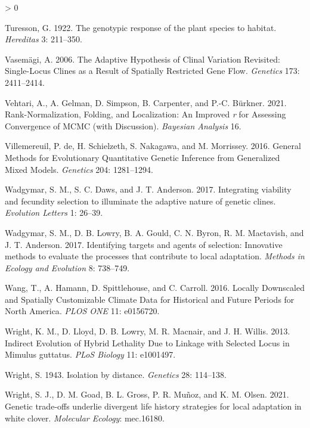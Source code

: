 \documentclass[
  12pt,
]{article}
\newlength{\cslhangindent}
\newenvironment{CSLReferences}[2] %
 {%
  \setlength{\parindent}{0pt}
  \ifodd #1 \everypar{\setlength{\hangindent}{\cslhangindent}}\ignorespaces\fi
  \ifnum #2 > 0
  \setlength{\parskip}{#2\baselineskip}
  \fi
 }%
 {}
\begin{document}
\begin{CSLReferences}{1}{0}
\leavevmode\hypertarget{ref-turesson_genotypic_1922}{}%
Turesson, G. 1922. The genotypic response of the plant species to habitat. \emph{Hereditas} 3: 211--350.

\leavevmode\hypertarget{ref-vasemagi_adaptive_2006}{}%
Vasemägi, A. 2006. The {Adaptive} {Hypothesis} of {Clinal} {Variation} {Revisited}: {Single}-{Locus} {Clines} as a {Result} of {Spatially} {Restricted} {Gene} {Flow}. \emph{Genetics} 173: 2411--2414.

\leavevmode\hypertarget{ref-vehtari_rank-normalization_2021}{}%
Vehtari, A., A. Gelman, D. Simpson, B. Carpenter, and P.-C. Bürkner. 2021. Rank-{Normalization}, {Folding}, and {Localization}: {An} {Improved} \emph{r} for {Assessing} {Convergence} of {MCMC} (with {Discussion}). \emph{Bayesian Analysis} 16.

\leavevmode\hypertarget{ref-de_villemereuil_general_2016}{}%
Villemereuil, P. de, H. Schielzeth, S. Nakagawa, and M. Morrissey. 2016. General {Methods} for {Evolutionary} {Quantitative} {Genetic} {Inference} from {Generalized} {Mixed} {Models}. \emph{Genetics} 204: 1281--1294.

\leavevmode\hypertarget{ref-wadgymar_integrating_2017}{}%
Wadgymar, S. M., S. C. Daws, and J. T. Anderson. 2017. Integrating viability and fecundity selection to illuminate the adaptive nature of genetic clines. \emph{Evolution Letters} 1: 26--39.

\leavevmode\hypertarget{ref-wadgymar_identifying_2017}{}%
Wadgymar, S. M., D. B. Lowry, B. A. Gould, C. N. Byron, R. M. Mactavish, and J. T. Anderson. 2017. Identifying targets and agents of selection: Innovative methods to evaluate the processes that contribute to local adaptation. \emph{Methods in Ecology and Evolution} 8: 738--749.

\leavevmode\hypertarget{ref-wang_locally_2016}{}%
Wang, T., A. Hamann, D. Spittlehouse, and C. Carroll. 2016. Locally {Downscaled} and {Spatially} {Customizable} {Climate} {Data} for {Historical} and {Future} {Periods} for {North} {America}. \emph{PLOS ONE} 11: e0156720.

\leavevmode\hypertarget{ref-wright_indirect_2013}{}%
Wright, K. M., D. Lloyd, D. B. Lowry, M. R. Macnair, and J. H. Willis. 2013. Indirect {Evolution} of {Hybrid} {Lethality} {Due} to {Linkage} with {Selected} {Locus} in {Mimulus} guttatus. \emph{PLoS Biology} 11: e1001497.

\leavevmode\hypertarget{ref-wright_isolation_1943}{}%
Wright, S. 1943. Isolation by distance. \emph{Genetics} 28: 114--138.

\leavevmode\hypertarget{ref-wright_genetic_2021}{}%
Wright, S. J., D. M. Goad, B. L. Gross, P. R. Muñoz, and K. M. Olsen. 2021. Genetic trade‐offs underlie divergent life history strategies for local adaptation in white clover. \emph{Molecular Ecology}: mec.16180.

\end{CSLReferences}
\end{document}
